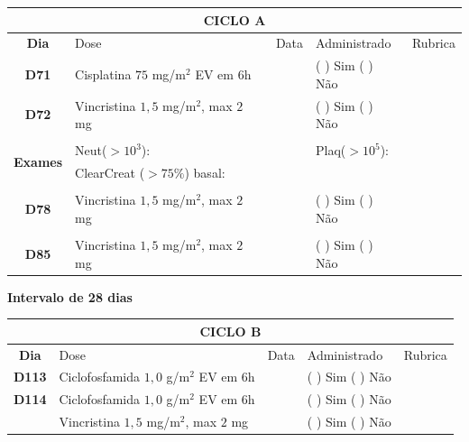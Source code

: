 \documentclass[11pt,a4paper,oldfontcommands]{memoir}
\begin{document}
\begin{center}
\begin{table}[H]
\begin{tabular}{p{1cm}p{6cm}|p{1cm}|p{3cm}|p{2.5cm}}
	\hline
	\multicolumn{5}{c}{\textbf{CICLO A}}\\
\hline
    \multicolumn{1}{c|}{\multirow{1}{*}{\textbf{Dia}}}&{Dose}&{Data}&{Administrado}&{Rubrica} \\
    \hline
    \multicolumn{1}{c|}{\multirow{1}{*}{\textbf{D71}}}&{Cisplatina \(75\) mg/m\(^2\) EV em 6h}&&{(  ) Sim (  ) Não}&\\
    \multicolumn{1}{c|}{\multirow{1}{*}{\textbf{D72}}}&{Vincristina \(1,5\) mg/m\(^2\), max \(2\) mg}&&{(  ) Sim (  ) Não}&\\
    \multicolumn{1}{c|}{\multirow{1}{*}{\textbf{}}}&&&&\\
    \hline
    \multicolumn{1}{c|}{\multirow{2}{*}{\textbf{Exames}}}&\multicolumn{2}{l|}{Neut(\(>10^3\)):}&{Plaq(\(>10^5\)):}&\\
    \cline{2-5}
    \multicolumn{1}{c|}{\multirow{2}{*}{{}}}&\multicolumn{2}{l|}{ClearCreat (\(>75\%\)) basal:}&{}&{}\\
    \hline
    \\
    \hline
    \multicolumn{1}{c|}{\multirow{1}{*}{\textbf{D78}}}&{Vincristina \(1,5\) mg/m\(^2\), max \(2\) mg}&&{(  ) Sim (  ) Não}&\\
    \hline
    \\
    \hline
    \multicolumn{1}{c|}{\multirow{1}{*}{\textbf{D85}}}&{Vincristina \(1,5\) mg/m\(^2\), max \(2\) mg}&&{(  ) Sim (  ) Não}&\\
    \hline
    \end{tabular}
    \end{table}
    \textbf{Intervalo de 28 dias}
   \begin{table}[H]
    \begin{tabular}{p{1cm}p{6cm}|p{1cm}|p{3cm}|p{2.5cm}}
    \hline
	\multicolumn{5}{c}{\textbf{CICLO B}}\\
	\hline
    \multicolumn{1}{c|}{\multirow{1}{*}{\textbf{Dia}}}&{Dose}&{Data}&{Administrado}&{Rubrica} \\
    \hline
    \multicolumn{1}{c|}{\multirow{1}{*}{\textbf{D113}}}&{Ciclofosfamida \(1,0\) g/m\(^2\) EV em 6h}&&{(  ) Sim (  ) Não}&\\
    \multicolumn{1}{c|}{\multirow{1}{*}{\textbf{D114}}}&{Ciclofosfamida \(1,0\) g/m\(^2\) EV em 6h}&&{(  ) Sim (  ) Não}&\\
    \multicolumn{1}{c|}{\multirow{1}{*}{\textbf{}}}&{Vincristina \(1,5\) mg/m\(^2\), max \(2\) mg}&&{(  ) Sim (  ) Não}&\\

\end{tabular}
\end{table}
\end{center}
\end{document}
